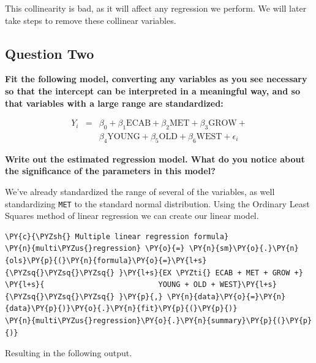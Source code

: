 \documentclass[10pt]{article}\usepackage[]{graphicx}\usepackage[]{xcolor}
\begin{document}
This collinearity is bad, as it will affect any regression we perform.
We will later take steps to remove these collinear variables.

    \subsection*{Question Two}
    \textbf{Fit the following model, converting any variables as you see necessary so that the intercept can be
    interpreted in a meaningful way, and so that variables with a large range are standardized:}

    \begin{equation*}
        \begin{aligned}
            Y_i &=& \beta_0 +
                    \beta_1 \text{ECAB} +
                    \beta_2 \text{MET} +
                    \beta_3 \text{GROW} +\\
                    &&\beta_4 \text{YOUNG} +
                    \beta_5 \text{OLD} +
                    \beta_6 \text{WEST} +
                    \epsilon_i
        \end{aligned}
    \end{equation*}

    \textbf{Write out the estimated regression model. What do you notice about the significance of the parameters in
    this model?}\newline

    We've already standardized the range of several of the variables, as well standardizing \texttt{MET} to the standard
    normal distribution.  Using the Ordinary Least Squares method of linear regression we can create our linear model.

    \begin{Verbatim}[commandchars=\\\{\}]
\PY{c}{\PYZsh{} Multiple linear regression formula}
\PY{n}{multi\PYZus{}regression} \PY{o}{=} \PY{n}{sm}\PY{o}{.}\PY{n}{ols}\PY{p}{(}\PY{n}{formula}\PY{o}{=}\PY{l+s}{\PYZsq{}\PYZsq{}\PYZsq{} }\PY{l+s}{EX \PYZti{} ECAB + MET + GROW +}
\PY{l+s}{                          YOUNG + OLD + WEST}\PY{l+s}{\PYZsq{}\PYZsq{}\PYZsq{} }\PY{p}{,} \PY{n}{data}\PY{o}{=}\PY{n}{data}\PY{p}{)}\PY{o}{.}\PY{n}{fit}\PY{p}{(}\PY{p}{)}
\PY{n}{multi\PYZus{}regression}\PY{o}{.}\PY{n}{summary}\PY{p}{(}\PY{p}{)}
\end{Verbatim}

Resulting in the following output.
\end{document}
